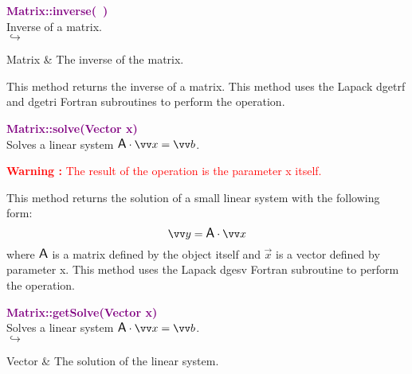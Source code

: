 \textcolor{purple}{\textbf{Matrix::inverse(~)}}\label{Matrix::inverse()}\\
Inverse of a matrix.\\ \hspace*{5mm}$\hookrightarrow$
\vspace*{-2em}\begin{tcolorbox}[grow to left by=-1cm, width=\textwidth-1cm,myArgs,tabularx={l|R}]
Matrix & The inverse of the matrix.
\end{tcolorbox}

This method returns the inverse of a matrix.
This method uses the Lapack \textsf{dgetrf} and \textsf{dgetri} Fortran subroutines to perform the operation.

\textcolor{purple}{\textbf{Matrix::solve(Vector x)}}\label{Matrix::solve(Vector x)}\\
Solves a linear system $\A\cdot \overrightarrow{x} = \overrightarrow{b}$.

\hspace*{10mm}\textcolor{red}{\textbf{Warning :}  The result of the operation is the parameter x itself.}

This method returns the solution of a small linear system with the following form:
\begin{equation*}
\overrightarrow{y} = \A \cdot \overrightarrow{x}
\end{equation*}
where $\mbox{\large\ensuremath{\mathsf{A}}}$ is a matrix defined by the object itself and $\overrightarrow{x}$ is a vector defined by parameter x.
This method uses the Lapack \textsf{dgesv} Fortran subroutine to perform the operation.

\textcolor{purple}{\textbf{Matrix::getSolve(Vector x)}}\label{Matrix::getSolve(Vector x)}\\
Solves a linear system $\A\cdot \overrightarrow{x} = \overrightarrow{b}$.\\ \hspace*{5mm}$\hookrightarrow$
\vspace*{-2em}\begin{tcolorbox}[grow to left by=-1cm, width=\textwidth-1cm,myArgs,tabularx={l|R}]
Vector & The solution of the linear system.
\end{tcolorbox}

